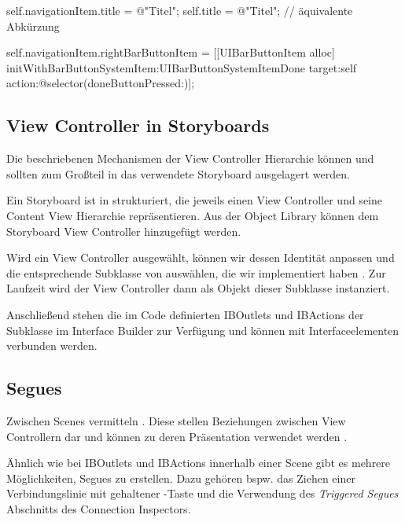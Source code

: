 \documentclass[parskip=half, final]{scrreprt}
\begin{document}
\begin{objclst}
self.navigationItem.title = @"Titel";
self.title = @"Titel"; // äquivalente Abkürzung

self.navigationItem.rightBarButtonItem = [[UIBarButtonItem alloc] initWithBarButtonSystemItem:UIBarButtonSystemItemDone target:self action:@selector(doneButtonPressed:)];
\end{objclst}

\subsection{View Controller in Storyboards}

Die beschriebenen Mechanismen der View Controller Hierarchie können und sollten zum Großteil in das verwendete Storyboard ausgelagert werden.

Ein Storyboard ist in  strukturiert, die jeweils einen View Controller und seine Content View Hierarchie repräsentieren. Aus der Object Library können dem Storyboard View Controller hinzugefügt werden.

Wird ein View Controller ausgewählt, können wir dessen Identität anpassen und die entsprechende Subklasse von  auswählen, die wir implementiert haben . Zur Laufzeit wird der View Controller dann als Objekt dieser Subklasse instanziert.


Anschließend stehen die im Code definierten IBOutlets und IBActions der  Subklasse im Interface Builder zur Verfügung und können mit Interfaceelementen verbunden werden.

\subsection{Segues}

Zwischen Scenes vermitteln . Diese stellen Beziehungen zwischen View Controllern dar und können zu deren Präsentation verwendet werden .


Ähnlich wie bei IBOutlets und IBActions innerhalb einer Scene gibt es mehrere Möglichkeiten, Segues zu erstellen. Dazu gehören bspw. das Ziehen einer Verbindungslinie mit gehaltener \keys{\ctrlkey}-Taste und die Verwendung des \emph{Triggered Segues} Abschnitts des Connection Inspectors.
\end{document}
